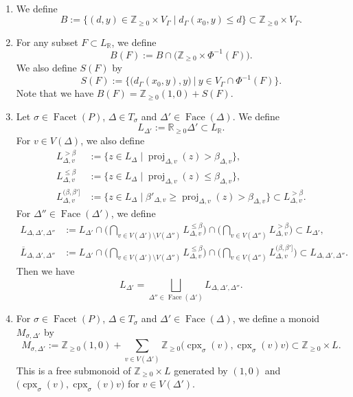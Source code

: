 \documentclass[11pt]{article}
\theoremstyle{definition}
\numberwithin{equation}{section}
\begin{document}
\begin{defn}\label{defi:M} \,
\begin{enumerate}
\item 
We define 
\[
B := \{ (d,y) \in \mathbb{Z}_{\ge 0} \times V_{\Gamma} \mid d_{\Gamma}(x_0, y) \le d \} \subset \mathbb{Z}_{\ge 0} \times V_{\Gamma}. 
\]

\item
For any subset $F \subset L_{\mathbb{R}}$, we define 
\[
B(F) := B \cap  \bigl( \mathbb{Z}_{\ge 0} \times \Phi^{-1}(F) \bigr). 
\]
We also define $S(F)$ by 
\[
S(F) := \bigl\{ \bigl( d_{\Gamma}(x_0, y), y \bigr) \ \big| \  y \in V_{\Gamma} \cap \Phi ^{-1}(F)  \bigr\}. 
\]
Note that we have $B(F) = \mathbb{Z}_{\ge 0}(1,0) + S(F)$. 

\item 
Let $\sigma \in \operatorname{Facet}(P)$, $\Delta \in T_{\sigma}$ and $\Delta ' \in \operatorname{Face}(\Delta)$. 
We define 
\[
L_{\Delta '} := \mathbb{R}_{\ge 0}\Delta ' \subset L_{\mathbb{R}}. 
\]
For $v \in V(\Delta)$, we also define 
\begin{align*}
L_{\Delta, v} ^{> \beta} 
&:= \{ z \in L_{\Delta} \mid \operatorname{proj}_{\Delta, v}(z) > \beta _{\Delta, v} \}, \\
L_{\Delta, v} ^{\le \beta} 
&:= \{ z \in L_{\Delta} \mid \operatorname{proj}_{\Delta, v}(z) \le \beta _{\Delta, v} \}, \\
L_{\Delta, v} ^{(\beta, \beta']} 
&:= \{ z \in L_{\Delta} \mid  \beta' _{\Delta, v}  \ge \operatorname{proj}_{\Delta, v}(z) > \beta _{\Delta, v} \} \subset L_{\Delta, v} ^{> \beta}. 
\end{align*}
For $\Delta '' \in \operatorname{Face}(\Delta ')$, we define  
\begin{align*}
L_{\Delta, \Delta ', \Delta''}
&:= L_{\Delta '}
\cap \Biggl( \bigcap _{v \in V(\Delta ') \setminus V(\Delta '')} L_{\Delta, v} ^{\le \beta} \Biggr)
\cap \Biggl( \bigcap _{v \in V(\Delta '')} L_{\Delta, v} ^{> \beta} \Biggr)
\subset L_{\Delta '}, \\
\overline{L}_{\Delta, \Delta ', \Delta''} 
&:= L_{\Delta '}
\cap \Biggl( \bigcap _{v \in V(\Delta ') \setminus V(\Delta '')} L_{\Delta, v} ^{\le \beta} \Biggr) 
\cap \Biggl( \bigcap _{v \in V(\Delta '')} L_{\Delta, v} ^{(\beta, \beta']} \Biggr)
\subset L_{\Delta, \Delta ', \Delta''}. 
\end{align*}
Then we have 
\[
L_{\Delta '} = \bigsqcup _{\Delta '' \in \operatorname{Face}(\Delta ')} L_{\Delta, \Delta ', \Delta''}. 
\]

\item 
For $\sigma \in \operatorname{Facet}(P)$, $\Delta \in T_{\sigma}$ and $\Delta ' \in \operatorname{Face}(\Delta)$, 
we define a monoid $M_{\sigma, \Delta '}$ by 
\[
M_{\sigma, \Delta '} := \mathbb{Z}_{\ge 0}(1,0) + 
\sum _{v \in V(\Delta ')} \mathbb{Z}_{\ge 0} \bigl( \operatorname{cpx}_{\sigma}(v), \operatorname{cpx}_{\sigma}(v) v \bigr) 
\subset \mathbb{Z} _{\ge 0} \times L. 
\]
This is a free submonoid of $\mathbb{Z} _{\ge 0} \times L$ generated by $(1,0)$ and 
$\bigl( \operatorname{cpx}_{\sigma}(v), \operatorname{cpx}_{\sigma}(v) v \bigr)$ for $v \in V(\Delta ')$. 
\end{enumerate}
\end{defn}
\end{document}
